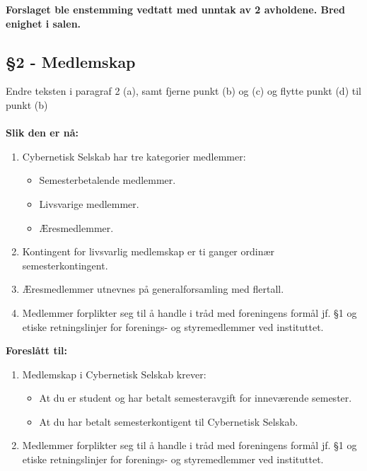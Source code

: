 \documentclass[10pt,norsk,a4paper,usenames,dvipsnames]{article}
\begin{document}
        \textbf{Forslaget ble enstemming vedtatt med unntak av 2 avholdene. Bred enighet i salen.}
    
    \subsection{§2 - Medlemskap}
        Endre teksten i paragraf 2 (a), samt fjerne punkt (b) og (c) og flytte punkt (d) til punkt (b)
        \\\\\textbf{Slik den er nå:}
        \begin{enumerate} 
        	\item{Cybernetisk Selskab har tre kategorier medlemmer:}
        	\begin{itemize}
        		\item{Semesterbetalende medlemmer.}
        		\item{Livsvarige medlemmer.}
        		\item{Æresmedlemmer.}
        	\end{itemize}
        	\item{Kontingent for livsvarlig medlemskap er ti ganger ordinær semesterkontingent.}
        	\item{Æresmedlemmer utnevnes på generalforsamling med  flertall.}
        	\item Medlemmer forplikter seg til å handle i tråd med foreningens formål jf. §1 og etiske retningslinjer for forenings- og styremedlemmer ved instituttet.\\
        \end{enumerate}
        
        \textbf{Foreslått til:}
        \begin{enumerate} 
        	\item{Medlemskap i Cybernetisk Selskab krever:}
        	\begin{itemize}
        		\item{At du er student og har betalt semesteravgift for inneværende semester.}
        		\item{At du har betalt semesterkontigent til Cybernetisk Selskab.}
        	\end{itemize}
        	\item Medlemmer forplikter seg til å handle i tråd med foreningens formål jf. §1 og etiske retningslinjer for forenings- og styremedlemmer ved instituttet.
        \end{enumerate}
        
\end{document}
